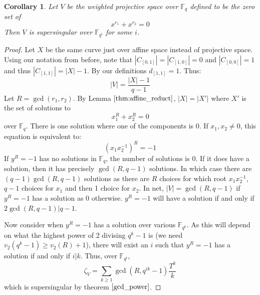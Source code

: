 \documentclass{article}
\newcommand{\F}{\mathbb{F}}
\newtheorem{corollary}{Corollary}[theorem]
\theoremstyle{definition}
\theoremstyle{definition}
\theoremstyle{remark}
\begin{document}
\begin{corollary}
Let $V$ be the weighted projective space over $\F_q$ defined to be the zero set of 
\[x^{r_1} + x^{r_2} = 0\]
Then $V$ is supersingular over $\F_{q^i}$ for some $i$.
\end{corollary}
\begin{proof}
Let $X$ be the same curve just over affine space instead of projective space. Using our notation from before, note that $|C_{[0,1]}|=|C_{[1,0]}| = 0$ and $|C_{[0,0]}| = 1$ and thus $|C_{[1,1]}|  = |X| - 1$. By our definitions $d_{[1,1]} = 1$. Thus:
\[|V| = \frac{|X| - 1}{q - 1}\]
Let $R = \gcd(r_1, r_2)$. By Lemma $\ref{thm:affine_reduct}$, $|X| = |X'|$ where $X'$ is the set of solutions to
\[x_1^{R} + x_2^{R} = 0\]
over $\F_q$. There is one solution where one of the components is 0. If $x_1, x_2 \neq 0$, this equation is equivalent to:
\[(x_1x_2^{-1})^R = -1\]
If $y^R = -1$ has no solutions in $\F_q$, the number of solutions is 0. If it does have a solution, then it has precisely $\gcd(R, q - 1)$ solutions. In which case there are $(q-1)\gcd(R, q - 1)$ solutions as there are $R$ choices for which root $x_1x_2^{-1}$, $q - 1$ choices for $x_1$ and then 1 choice for $x_2$. In net, $|V| = \gcd(R, q - 1)$ if $y^R = -1$ has a solution as 0 otherwise. $y^R = - 1$ will have a solution if and only if $2\gcd(R, q - 1) | q - 1$. 
\par
Now consider when $y^R = - 1$ has a solution over various $\F_{q^k}$. As this will depend on what the highest power of 2 divising $q^k - 1$ is (we need $v_2(q^k - 1) \ge v_2(R) + 1$), there will exist an $i$ such that $y^R = -1$ has a solution if and only if $i | k$. Thus, over $\F_{q^i}$,
\[\zeta_V = \sum_{k \ge 1} \gcd(R, q^{ik} - 1)\frac{T^k}{k}\]
which is supersingular by theorem $\ref{gcd_power}$.
\end{proof}
\end{document}
